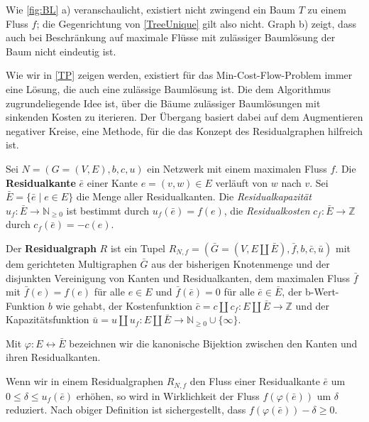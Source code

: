 Wie \cref{fig:BL} a) veranschaulicht, existiert nicht zwingend ein Baum $T$ zu einem Fluss $f$; die Gegenrichtung von \cref{TreeUnique} gilt also nicht. Graph b) zeigt, dass auch bei Beschränkung auf maximale Flüsse mit zulässiger Baumlösung der Baum nicht eindeutig ist.

Wie wir in \cref{TP} zeigen werden, existiert für das Min-Cost-Flow-Problem immer eine Lösung, die auch eine zulässige Baumlösung ist. Die dem Algorithmus zugrundeliegende Idee ist, über die Bäume zulässiger Baumlösungen mit sinkenden Kosten zu iterieren. Der Übergang basiert dabei auf dem Augmentieren negativer Kreise, eine Methode, für die das Konzept des Residualgraphen hilfreich ist.

\begin{defn}\label{defRes}Sei $N=(G=(V,E),b,c,u)$ ein Netzwerk mit einem maximalen Fluss $f$. Die \textbf{Residualkante} $\bar{e}$ einer Kante $e=(v,w)\in E$ verläuft von $w$ nach $v$. Sei $\bar{E}=\{\bar{e}\mid e\in E\}$ die Menge aller Residualkanten. Die \textit{Residualkapazität} $u_f\colon\bar{E}\rightarrow\mathbb{N}_{\geq0}$ ist bestimmt durch $u_f(\bar{e})=f(e)$, die \textit{Residualkosten} $c_f\colon\bar{E}\rightarrow\mathbb{Z}$ durch $c_f(\bar{e})=-c(e)$.

Der \textbf{Residualgraph} $R$ ist ein Tupel $R_{N,f}=(\bar{G}=(V,E\amalg\bar{E}),\bar{f},b,\bar{c},\bar{u})$ mit dem gerichteten Multigraphen $\bar{G}$ aus der bisherigen Knotenmenge und der disjunkten Vereinigung von Kanten und Residualkanten, dem maximalen Fluss $\bar{f}$ mit $\bar{f}(e)=f(e)$ für alle $e\in E$ und $\bar{f}(\bar{e})=0$ für alle $\bar{e}\in\bar{E}$, der b-Wert-Funktion $b$ wie gehabt, der Kostenfunktion $\bar{c}=c\amalg c_f\colon E\amalg\bar{E}\rightarrow\mathbb{Z}$ und der Kapazitätsfunktion $\bar{u}=u\amalg u_f\colon E\amalg\bar{E}\rightarrow\mathbb{N}_{\geq0}\cup \{\infty\}$.\end{defn}

\begin{nota}Mit $\varphi\colon E\leftrightarrow\bar{E}$ bezeichnen wir die kanonische Bijektion zwischen den Kanten und ihren Residualkanten.\end{nota}

Wenn wir in einem Residualgraphen $R_{N,f}$ den Fluss einer Residualkante $\bar{e}$ um $0\leq\delta\leq u_f(\bar{e})$ erhöhen, so wird in Wirklichkeit der Fluss $f(\varphi(\bar{e}))$ um $\delta$ reduziert. Nach obiger Definition ist sichergestellt, dass $f(\varphi(\bar{e}))-\delta\geq0$.

